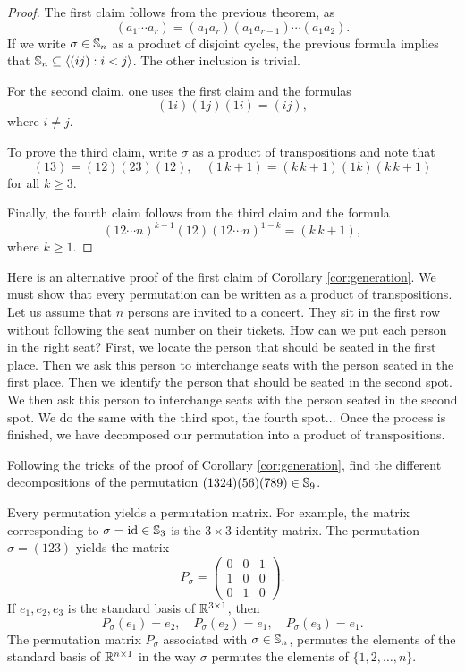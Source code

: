 \begin{proof}
        The first claim follows from the previous theorem, as 
        \[
        (a_1\cdots a_r)=(a_1a_r)(a_1a_{r-1})\cdots(a_1a_2).
        \]
        If we write $\sigma\in\mathbb{S}_n$ as a product of disjoint cycles, 
        the previous formula implies 
        that $\mathbb{S}_n\subseteq\langle (ij):i<j\rangle$. The other 
        inclusion is trivial. 

        For the second claim, one uses the first claim and the
        formulas 
        \[
        (1i)(1j)(1i)=(ij), 
        \]
        where $i\ne j$.

        To prove the third claim, write $\sigma$ as a product 
        of transpositions and 
        note that 
        \[
        (13)=(12)(23)(12),\quad
        (1\,k+1)=(k\,k+1)(1k)(k\,k+1)
        \]
        for all $k\geq3$.

        Finally, the fourth claim follows from 
        the third claim and 
        the formula 
        \[
        (12\cdots n)^{k-1}(12)(12\cdots n)^{1-k}=(k\,k+1),
        \]
        where $k\geq1$.
\end{proof}

Here is an alternative proof of
the first claim of Corollary 
\ref{cor:generation}. We must show that every 
permutation can be written as a product of transpositions. 
Let us assume that $n$ persons are invited to a concert. They sit
in the first row without following  
the seat number on their tickets. How can we put each person in 
the right seat? First, we locate the person that should be seated 
in the first place. Then we ask this person to 
interchange seats with the person seated in the first place. 
Then we identify the person 
that should be seated in the second spot. We then ask this person
to interchange seats with the person 
seated in the second spot. We do the same with the third spot, the fourth
spot... Once the process is finished, 
we have decomposed 
our permutation into a product of transpositions. 

\begin{exercise}
    Following the tricks of the proof of 
    Corollary \ref{cor:generation}, find the different
    decompositions of the permutation
    $(1324)(56)(789)\in\mathbb{S}_9$. 
\end{exercise}

Every permutation yields a permutation matrix. For example, 
the matrix corresponding to $\sigma=\operatorname{id}\in\mathbb{S}_3$ 
is the $3\times 3$ identity matrix. The permutation
$\sigma=(123)$ yields the matrix 
\[
P_\sigma=\begin{pmatrix}0&0&1\\1&0&0\\0&1&0\end{pmatrix}.
\]
If $e_1,e_2,e_3$ is the standard basis of $\mathbb{R}^{3\times1}$, then
\[
P_{\sigma}(e_1)=e_2,
\quad 
P_{\sigma}(e_2)=e_1,
\quad 
P_{\sigma}(e_3)=e_1.
\]
The permutation matrix
$P_\sigma$ associated with 
$\sigma\in\mathbb{S}_n$, permutes the elements of the standard basis
of $\mathbb{R}^{n\times1}$ in the way $\sigma$ permutes 
the elements of $\{1,2,\dots,n\}$.

